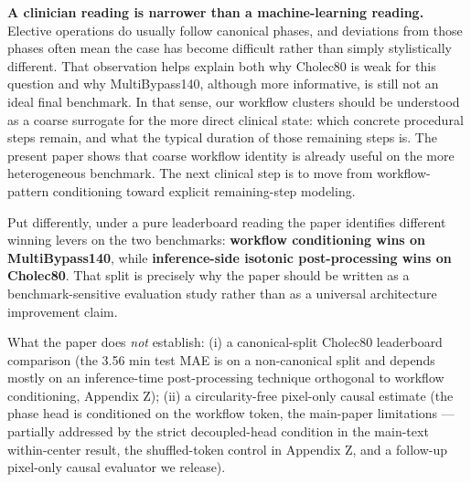 \textbf{A clinician reading is narrower than a machine-learning
reading.} Elective operations do usually follow canonical phases, and
deviations from those phases often mean the case has become difficult
rather than simply stylistically different. That observation helps
explain both why Cholec80 is weak for this question and why
MultiBypass140, although more informative, is still not an ideal final
benchmark. In that sense, our workflow clusters should be understood as
a coarse surrogate for the more direct clinical state: which concrete
procedural steps remain, and what the typical duration of those
remaining steps is. The present paper shows that coarse workflow
identity is already useful on the more heterogeneous benchmark. The next
clinical step is to move from workflow-pattern conditioning toward
explicit remaining-step modeling.

Put differently, under a pure leaderboard reading the paper identifies
different winning levers on the two benchmarks: \textbf{workflow
conditioning wins on MultiBypass140}, while \textbf{inference-side
isotonic post-processing wins on Cholec80}. That split is precisely why
the paper should be written as a benchmark-sensitive evaluation study
rather than as a universal architecture improvement claim.

What the paper does \emph{not} establish: (i) a canonical-split Cholec80
leaderboard comparison (the 3.56 min test MAE is on a non-canonical
split and depends mostly on an inference-time post-processing technique
orthogonal to workflow conditioning, Appendix Z); (ii) a
circularity-free pixel-only causal estimate (the phase head is
conditioned on the workflow token, the main-paper limitations --- partially addressed by the
strict decoupled-head condition in the main-text within-center result, the shuffled-token control in
Appendix Z, and a follow-up pixel-only causal evaluator we release).
